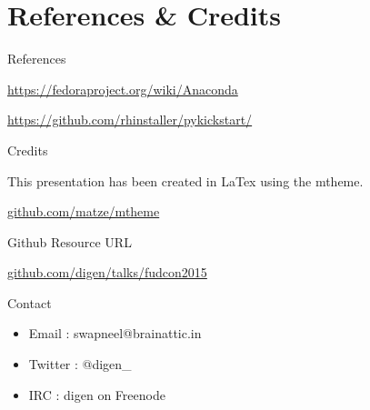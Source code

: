 \documentclass[10pt]{beamer}
\begin{document}



\section{References \& Credits}

\begin{frame}{References}
\begin{center}\url{https://fedoraproject.org/wiki/Anaconda}\end{center}
\begin{center}\url{https://github.com/rhinstaller/pykickstart/}\end{center}


\end{frame}

\begin{frame}{Credits}

  This presentation has been created in LaTex using the mtheme.
  \begin{center}\url{github.com/matze/mtheme}\end{center}


  \begin{center}\ccbysa\end{center}

\end{frame}

\begin{frame}{Github Resource URL}

  \begin{center}\url{github.com/digen/talks/fudcon2015}\end{center}
  \begin{center}\ccbysa\end{center}

\end{frame}



\begin{frame}{Contact}
\begin{itemize}
\item Email : {swapneel@brainattic.in}
\item Twitter : @digen\_
\item IRC   : digen on Freenode
\end{itemize}
\end{frame}

\end{document}
